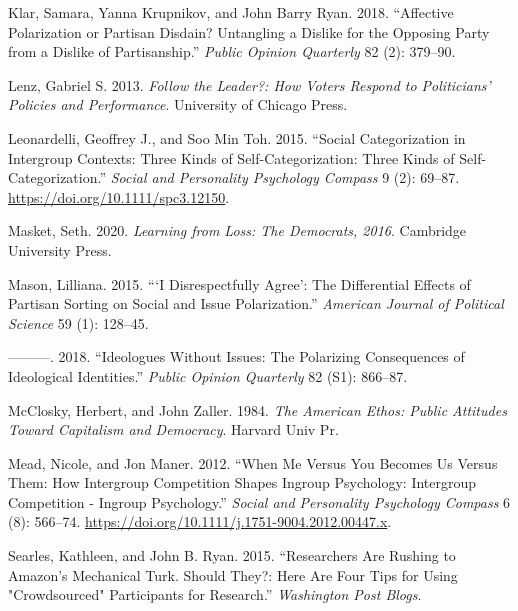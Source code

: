 \documentclass[
]{article}
\newlength{\cslhangindent}
\newenvironment{CSLReferences}[2] %
 {%
  \setlength{\parindent}{0pt}
  \ifodd #1 \everypar{\setlength{\hangindent}{\cslhangindent}}\ignorespaces\fi
  \ifnum #2 > 0
  \setlength{\parskip}{#2\baselineskip}
  \fi
 }%
 {}
\begin{document}
\begin{CSLReferences}{1}{0}
\leavevmode{}%
Klar, Samara, Yanna Krupnikov, and John Barry Ryan. 2018. {``Affective Polarization or Partisan Disdain? {Untangling} a Dislike for the Opposing Party from a Dislike of Partisanship.''} \emph{Public Opinion Quarterly} 82 (2): 379--90.

\leavevmode{}%
Lenz, Gabriel S. 2013. \emph{Follow the Leader?: How Voters Respond to Politicians' Policies and Performance}. {University of Chicago Press}.

\leavevmode{}%
Leonardelli, Geoffrey J., and Soo Min Toh. 2015. {``Social {Categorization} in {Intergroup Contexts}: {Three Kinds} of {Self}-{Categorization}: {Three Kinds} of {Self}-{Categorization}.''} \emph{Social and Personality Psychology Compass} 9 (2): 69--87. \url{https://doi.org/10.1111/spc3.12150}.

\leavevmode{}%
Masket, Seth. 2020. \emph{Learning from Loss: The Democrats, 2016}. {Cambridge University Press}.

\leavevmode{}%
Mason, Lilliana. 2015. {``{`{I} Disrespectfully Agree'}: The Differential Effects of Partisan Sorting on Social and Issue Polarization.''} \emph{American Journal of Political Science} 59 (1): 128--45.

\leavevmode{}%
---------. 2018. {``Ideologues Without Issues: The Polarizing Consequences of Ideological Identities.''} \emph{Public Opinion Quarterly} 82 (S1): 866--87.

\leavevmode{}%
McClosky, Herbert, and John Zaller. 1984. \emph{The American Ethos: Public Attitudes Toward Capitalism and Democracy}. {Harvard Univ Pr}.

\leavevmode{}%
Mead, Nicole, and Jon Maner. 2012. {``When {Me} Versus {You Becomes Us} Versus {Them}: {How Intergroup Competition Shapes Ingroup Psychology}: {Intergroup Competition} - {Ingroup Psychology}.''} \emph{Social and Personality Psychology Compass} 6 (8): 566--74. \url{https://doi.org/10.1111/j.1751-9004.2012.00447.x}.

\leavevmode{}%
Searles, Kathleen, and John B. Ryan. 2015. {``Researchers Are Rushing to {Amazon}'s {Mechanical Turk}. {Should} They?: {Here} Are Four Tips for Using "Crowdsourced" Participants for Research.''} \emph{Washington Post \textendash{} Blogs}.


\end{CSLReferences}
\end{document}
